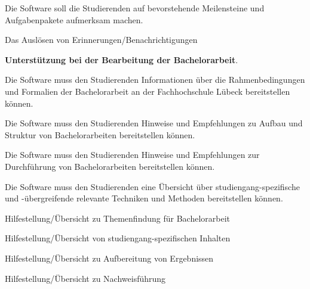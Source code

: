 \documentclass[bibliography=totoc,listof=totoc,BCOR=5mm,DIV=12,oneside]{scrbook}
\begin{document}
\begin{enumerate} [label=\textbf{PR\arabic*}]
\begin{enumerate} [label=\textit{[Req1.\arabic*]}]
\bigskip
\item \label{anf:erinnerungenBenachrichtigungen}Die Software soll die Studierenden auf bevorstehende Meilensteine und Aufgabenpakete aufmerksam machen.

\begin{enumerate} [label=\textit{[Req1.3.\arabic*]}]
\item \label{uanf:erinnerungAusloesen}Das Auslösen von Erinnerungen/Benachrichtigungen
\end{enumerate}
\end{enumerate}

\newpage
\item \label{prod:unterstuetzungBachelorarbeit} \textbf{Unterstützung bei der Bearbeitung der Bachelorarbeit}.
\begin{enumerate} [label=\textit{[Req2.\arabic*]}]

\item \label{anf:infRahmenbedingungenFormalien} Die Software muss den Studierenden Informationen über die Rahmenbedingungen und Formalien der Bachelorarbeit an der Fachhochschule Lübeck bereitstellen können.

\bigskip
\item \label{anf:infAufbauStruktur} Die Software muss den Studierenden Hinweise und Empfehlungen zu Aufbau und Struktur von Bachelorarbeiten bereitstellen können.

\bigskip
\item \label{anf:infDurchfuerungBachelorarbeit} Die Software muss den Studierenden Hinweise und Empfehlungen zur Durchführung von Bachelorarbeiten bereitstellen können.

\bigskip
\item \label{anf:infMethodenTechniken} Die Software muss den Studierenden eine Übersicht über studiengang-spezifische und -übergreifende relevante Techniken und Methoden bereitstellen können.

\begin{enumerate} [label=\textit{[Req2.4.\arabic*]}]
\item \label{uanf:infThemenfindung} Hilfestellung/Übersicht zu Themenfindung für Bachelorarbeit
\item \label{uanf:infInhalt} Hilfestellung/Übersicht von studiengang-spezifischen Inhalten
\item \label{uanf:infAufbereitungErgebnisse} Hilfestellung/Übersicht zu Aufbereitung von Ergebnissen
\item \label{uanf:infNachweisfuerung} Hilfestellung/Übersicht zu Nachweisführung
\end{enumerate}


\end{enumerate}
\end{enumerate}
\end{document}
